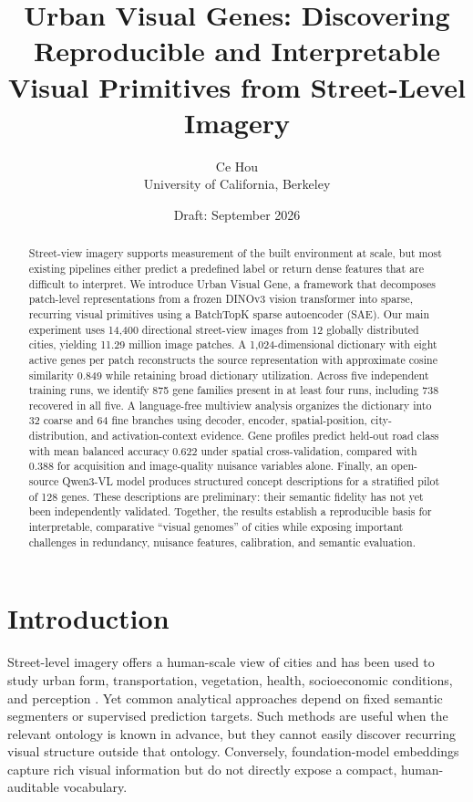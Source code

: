 \documentclass[10pt]{article}
\title{Urban Visual Genes: Discovering Reproducible and Interpretable\\
Visual Primitives from Street-Level Imagery}
\author{Ce Hou\\University of California, Berkeley\\\texttt{\todo{email}}
\and \todo{Wenrui Xu, affiliation}
\and \todo{Emma Pierson, affiliation}}
\date{Draft: September 2026}
\newcommand{\method}{Urban Visual Gene}
\begin{document}
\maketitle

\begin{abstract}
Street-view imagery supports measurement of the built environment at scale, but
most existing pipelines either predict a predefined label or return dense features
that are difficult to interpret. We introduce \method, a framework that decomposes
patch-level representations from a frozen DINOv3 vision transformer into sparse,
recurring visual primitives using a BatchTopK sparse autoencoder (SAE). Our main
experiment uses 14,400 directional street-view images from 12 globally distributed
cities, yielding 11.29 million image patches. A 1,024-dimensional dictionary with
eight active genes per patch reconstructs the source representation with approximate
cosine similarity 0.849 while retaining broad dictionary utilization. Across five
independent training runs, we identify 875 gene families present in at least four
runs, including 738 recovered in all five. A language-free multiview analysis
organizes the dictionary into 32 coarse and 64 fine branches using decoder, encoder,
spatial-position, city-distribution, and activation-context evidence. Gene profiles
predict held-out road class with mean balanced accuracy 0.622 under spatial
cross-validation, compared with 0.388 for acquisition and image-quality nuisance
variables alone. Finally, an open-source Qwen3-VL model produces structured concept
descriptions for a stratified pilot of 128 genes. These descriptions are preliminary:
their semantic fidelity has not yet been independently validated. Together, the
results establish a reproducible basis for interpretable, comparative ``visual
genomes'' of cities while exposing important challenges in redundancy, nuisance
features, calibration, and semantic evaluation.
\end{abstract}

\section{Introduction}
Street-level imagery offers a human-scale view of cities and has been used to study
urban form, transportation, vegetation, health, socioeconomic conditions, and
perception \cite{biljecki2021streetview}. Yet common analytical approaches depend on
fixed semantic segmenters or supervised prediction targets. Such methods are useful
when the relevant ontology is known in advance, but they cannot easily discover
recurring visual structure outside that ontology. Conversely, foundation-model
embeddings capture rich visual information but do not directly expose a compact,
human-auditable vocabulary.
\end{document}
